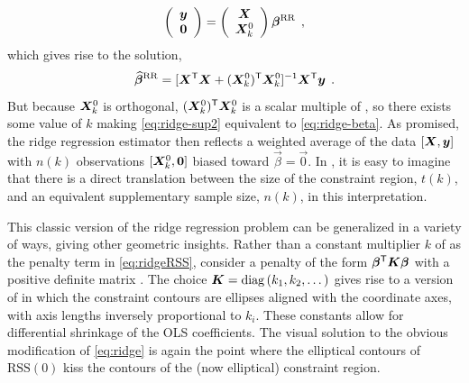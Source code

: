 \begin{equation} \label{eq:ridge-sup1}
\left(
\begin{array}{c} \bm{y} \\ \bm{0} \end{array}
\right)
=
\left(
\begin{array}{c} \bm{X} \\ \bm{X}_k^0 \end{array}
\right)
\bm{\beta}^{\mathrm{RR}} \:\: ,
\end{equation}
which gives rise to the solution,
\begin{equation} \label{eq:ridge-sup2}
\widehat{\bm{\beta}}^{\mathrm{RR}} = [\bm{X}^\mathsf{T} \bm{X} + (\bm{X}_k^0)^\mathsf{T} \bm{X}_k^0]^{-1} \bm{X}^\mathsf{T} \bm{y} \:\: .
\end{equation}
But because $\bm{X}_k^0$ is orthogonal, $(\bm{X}_k^0)^\mathsf{T} \bm{X}_k^0$ is a scalar multiple of , so there
exists some value of $k$ making \eqref{eq:ridge-sup2} equivalent to \eqref{eq:ridge-beta}.  As promised, the
ridge regression estimator then reflects a weighted average of the data $[\bm{X}, \bm{y}]$ with $n(k)$ observations
$[\bm{X}_k^0, \bm{0}]$
biased toward $\vec{\beta}=\vec{0}$. In , it is easy to imagine that there is a direct translation between
the size of the constraint region, $t(k)$, and an equivalent supplementary sample size, $n(k)$, in this interpretation.

This classic version of the ridge regression problem can be generalized in a variety of ways, giving other geometric
insights.  Rather than a constant multiplier $k$ of \vec{\beta}\trans \vec{\beta} as the penalty term in \eqref{eq:ridgeRSS},
consider a penalty of the form $\bm{\beta}^\mathsf{T} \bm{K} \bm{\beta}$ with
a positive definite matrix .
The choice $\bm{K} = \mathrm{diag}\, (k_1, k_2, \dots)$ gives rise to a version of
 in which the constraint contours are ellipses aligned with the coordinate axes, with
axis lengths inversely proportional to $k_i$.  These constants allow for differential shrinkage of the OLS coefficients.
The visual solution to the obvious modification of \eqref{eq:ridge} is again the point where the elliptical
contours of $\mathrm{RSS}(0)$ kiss the contours of the (now elliptical) constraint region.



